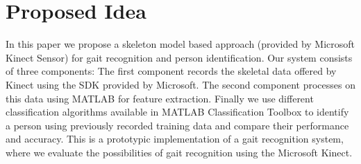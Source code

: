 \section{Proposed Idea} \label{Proposed Idea}
\noindent In this paper we propose a skeleton model based approach (provided by Microsoft Kinect Sensor) for gait recognition and person identification. Our system consists of three components: The first component records the skeletal data offered by Kinect using the SDK provided by Microsoft. The second component processes on this data using MATLAB for feature extraction. Finally we use different classification algorithms available in MATLAB Classification Toolbox to identify a person using previously recorded training data and compare their performance and accuracy. This is a prototypic implementation of a gait recognition system, where we evaluate the possibilities of gait recognition using the Microsoft Kinect.
